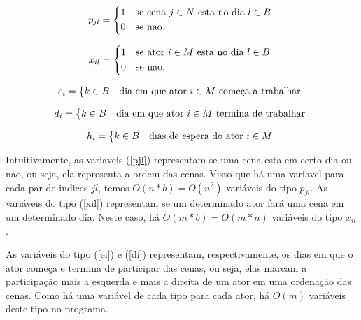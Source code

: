 \documentclass[a4paper,11pt,twoside]{article}
\begin{document}
\begin{equation}
  p_{jl} = \begin{dcases*}
              1 & se cena $j \in N$ esta no dia $l \in B$ \\
              0 & se nao.
           \end{dcases*}
  \label{pjl}
\end{equation}

\begin{equation}
  x_{il} = \begin{dcases*}
              1 & se ator $i \in M$ esta no dia $l \in B$ \\
              0 & se nao.
           \end{dcases*}
  \label{xil}
\end{equation}

\begin{equation}
  e_{i} = \begin{dcases*} k \in B & dia em que ator $i \in M$ começa a trabalhar \end{dcases*}
  \label{ei}
\end{equation}

\begin{equation}
  d_{i} = \begin{dcases*} k \in B & dia em que ator $i \in M$ termina de trabalhar \end{dcases*}
  \label{di}
\end{equation}

\begin{equation}
  h_{i} = \begin{dcases*} k \in B & dias de espera do ator $i \in M$ \end{dcases*}
  \label{hi}
\end{equation}

Intuitivamente, as variaveis (\ref{pjl}) representam se uma cena esta em certo dia
ou nao, ou seja, ela representa a ordem das cenas. Visto que há uma variavel para
cada par de indices $jl$, temos $O(n*b) = O(n^2)$ variáveis do tipo $p_{jl}$. As
variáveis do tipo (\ref{xil}) representam se um determinado ator fará uma cena
em um determinado dia. Neste caso, há $O(m*b) = O(m*n)$ variáveis do tipo $x_{il}$.

As variáveis do tipo (\ref{ei}) e (\ref{di}) representam, respectivamente, os dias em que o ator
começa e termina de participar das cenas, ou seja, elas marcam a participação
mais a esquerda e mais a direita de um ator em uma ordenação das cenas. Como há
uma variável de cada tipo para cada ator, há $O(m)$ variáveis deste tipo no programa.
\end{document}
